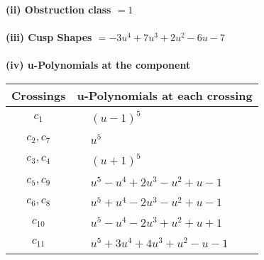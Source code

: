 \documentclass[1p]{elsarticle_modified}
\theoremstyle{definition}
\begin{document}
\flushleft \textbf{(ii) Obstruction class $= 1$}\\~\\
\flushleft \textbf{(iii) Cusp Shapes $= -3 u^4+7 u^3+2 u^2-6 u-7$}\\~\\
\newpage\renewcommand{\arraystretch}{1}
\flushleft \textbf{(iv) u-Polynomials at the component}\newline \\
\begin{tabular}{m{50pt}|m{274pt}}
Crossings & \hspace{64pt}u-Polynomials at each crossing \\
\hline $$\begin{aligned}c_{1}\end{aligned}$$&$\begin{aligned}
&(u-1)^5
\end{aligned}$\\
\hline $$\begin{aligned}c_{2},c_{7}\end{aligned}$$&$\begin{aligned}
&u^5
\end{aligned}$\\
\hline $$\begin{aligned}c_{3},c_{4}\end{aligned}$$&$\begin{aligned}
&(u+1)^5
\end{aligned}$\\
\hline $$\begin{aligned}c_{5},c_{9}\end{aligned}$$&$\begin{aligned}
&u^5- u^4+2 u^3- u^2+u-1
\end{aligned}$\\
\hline $$\begin{aligned}c_{6},c_{8}\end{aligned}$$&$\begin{aligned}
&u^5+u^4-2 u^3- u^2+u-1
\end{aligned}$\\
\hline $$\begin{aligned}c_{10}\end{aligned}$$&$\begin{aligned}
&u^5- u^4-2 u^3+u^2+u+1
\end{aligned}$\\
\hline $$\begin{aligned}c_{11}\end{aligned}$$&$\begin{aligned}
&u^5+3 u^4+4 u^3+u^2- u-1
\end{aligned}$\\
\hline
\end{tabular}\\~\\
\end{document}
